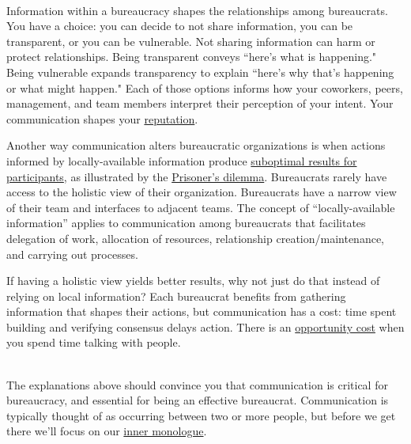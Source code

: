\ \\

Information within a bureaucracy shapes the relationships among bureaucrats. You have a choice: you can decide to not share information, you can be transparent, or you can be vulnerable.  
Not sharing information can harm or protect relationships. 
Being transparent conveys ``here's what is happening." Being vulnerable expands transparency to explain ``here's why that's happening or what might happen."
Each of those options informs how your coworkers, peers, management, and team members interpret their perception of your intent. Your communication shapes your \hyperref[sec:reputation]{reputation}.


Another way communication alters bureaucratic organizations is when actions informed by locally-available information produce \hyperref[sec:failure-to-comm]{suboptimal results for participants}, 
as illustrated by the
\href{https://en.wikipedia.org/wiki/Prisoner\%27s\_dilemma}{Prisoner's dilemma}.
Bureaucrats rarely have access to the holistic view of their organization. Bureaucrats have a narrow view of their team and interfaces to adjacent teams.
The concept of ``locally-available information'' applies to communication among bureaucrats that facilitates delegation of work, allocation of resources, relationship creation/maintenance, and carrying out processes. 

If having a holistic view yields better results, why not just do that instead of relying on local information? Each bureaucrat benefits from gathering information that shapes their actions, but communication has a cost: time spent building and verifying consensus delays action. There is an 
\href{https://en.wikipedia.org/wiki/Opportunity_cost}{opportunity cost}
when you spend time talking with people.




\ \\

The explanations above should convince you that communication is critical for bureaucracy, and essential for being an effective bureaucrat. Communication is typically thought of as occurring between two or more people, but before we get there we'll focus on our \href{https://en.wikipedia.org/wiki/Intrapersonal_communication}{inner monologue}. 
